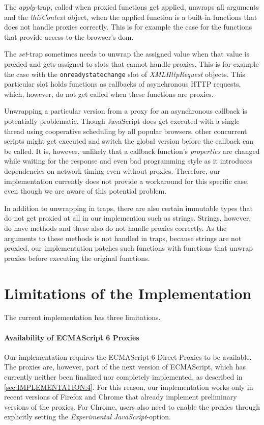 The \emph{apply}-trap, called when proxied functions get applied, unwraps all arguments and the \emph{thisContext} object, when the applied function is a built-in functions that does not handle proxies correctly.
This is for example the case for the functions that provide access to the browser's \ac{dom}.

The \emph{set}-trap sometimes needs to unwrap the assigned value when that value is proxied and gets assigned to slots that cannot handle proxies.
This is for example the case with the \lstinline{onreadystatechange} slot of \emph{XMLHttpRequest} objects.
This particular slot holds functions as callbacks of asynchronous HTTP requests, which, however, do not get called when these functions are proxies.

Unwrapping a particular version from a proxy for an asynchronous callback is potentially problematic.
Though JavaScript does get executed with a single thread using cooperative scheduling by all popular browsers, other concurrent scripts might get executed and switch the global version before the callback can be called.
It is, however, unlikely that a callback function's \emph{properties} are changed while waiting for the response and even bad programming style as it introduces dependencies on network timing even without proxies.
Therefore, our implementation currently does not provide a workaround for this specific case, even though we are aware of this potential problem. 

In addition to unwrapping in traps, there are also certain immutable types that do not get proxied at all in our implemention such as strings.
Strings, however, do have methods and these also do not handle proxies correctly.
As the arguments to these methods is not handled in traps, because strings are not proxied, our implementation patches such functions with functions that unwrap proxies before executing the original functions.





\section{Limitations of the Implementation}

The current implementation has three limitations.

\paragraph{Availability of ECMAScript 6 Proxies}
Our implementation requires the ECMAScript 6 Direct Proxies to be available.
The proxies are, however, part of the next version of ECMAScript, which has currently neither been finalized nor completely implemented, as described in \ref{sec:IMPLEMENTATION:4}.
For this reason, our implementation works only in recent versions of Firefox and Chrome that already implement preliminary versions of the proxies.
For Chrome, users also need to enable the proxies through explicitly setting the \emph{Experimental JavaScript}-option.

